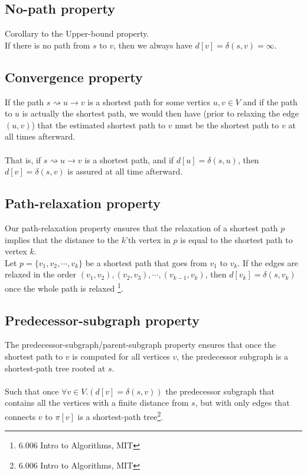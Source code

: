 \documentclass[11pt]{article}
\begin{document}
\subsection{No-path property} Corollary to the Upper-bound property.\\
If there is no path from $s$ to $v$, then we always have $d[v] = \delta(s,v) = \infty$.\\
\subsection{Convergence property}
If the path $s \rightsquigarrow u \rightarrow v$ is a shortest path for some vertics $u,v\in V$ and if the path to $u$ is actually the shortest path, we would then have (prior to relaxing the edge $(u,v)$) that the estimated shortest path to $v$ must be the shortest path to $v$ at all times afterward.\\\\
That is, if $s\rightsquigarrow u\rightarrow v$ is a shortest path, and if $d[u] = \delta(s,u)$, then $d[v] = \delta(s,v)$ is assured at all time afterward.\\
\subsection{Path-relaxation property}
Our path-relaxation property ensures that the relaxation of a shortest path $p$ implies that the distance to the $k$'th vertex in $p$ is equal to the shortest path to vertex $k$.\\
Let $p = \{v_{1}, v_{2},\cdots ,v_{k}\}$ be a shortest path that goes from $v_{1}$ to $v_{k}$. If the edges are relaxed in the order $(v_{1},v_{2}), (v_{2},v_{3}), \cdots , (v_{k-1}, v_{k})$, then $d[v_{k}] = \delta(s,v_{k})$ once the whole path is relaxed \footnote{6.006 Intro to Algorithms, MIT}.
\subsection{Predecessor-subgraph property}
The predecessor-subgraph/parent-subgraph property ensures that once the shortest path to $v$ is computed for all vertices $v$, the predecessor subgraph is a shortest-path tree rooted at $s$.\\\\
Such that once $\forall v \in V.(d[v] = \delta(s,v))$ the predecessor subgraph that contains all the vertices with a finite distance from $s$, but with only edges that connects $v$ to $\pi[v]$ is a shortest-path tree\footnote{6.006 Intro to Algorithms, MIT}.
\end{document}
